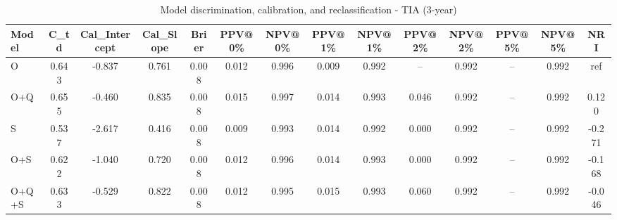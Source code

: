 \begin{table}[htbp]
\centering
\small
\caption{Model discrimination, calibration, and reclassification - TIA (3-year)}
\label{tab:perf_tia_3y}
\begin{tabular}{lccccccccccccc}
\toprule
Model & C\_td & Cal\_Intercept & Cal\_Slope & Brier & PPV@0\% & NPV@0\% & PPV@1\% & NPV@1\% & PPV@2\% & NPV@2\% & PPV@5\% & NPV@5\% & NRI \\
\midrule
O & 0.643 & -0.837 & 0.761 & 0.008 & 0.012 & 0.996 & 0.009 & 0.992 & -- & 0.992 & -- & 0.992 & ref \\
O+Q & 0.655 & -0.460 & 0.835 & 0.008 & 0.015 & 0.997 & 0.014 & 0.993 & 0.046 & 0.992 & -- & 0.992 & 0.120 \\
S & 0.537 & -2.617 & 0.416 & 0.008 & 0.009 & 0.993 & 0.014 & 0.992 & 0.000 & 0.992 & -- & 0.992 & -0.271 \\
O+S & 0.622 & -1.040 & 0.720 & 0.008 & 0.012 & 0.996 & 0.014 & 0.993 & 0.000 & 0.992 & -- & 0.992 & -0.168 \\
O+Q+S & 0.633 & -0.529 & 0.822 & 0.008 & 0.012 & 0.995 & 0.015 & 0.993 & 0.060 & 0.992 & -- & 0.992 & -0.046 \\
\bottomrule
\end{tabular}
\end{table}